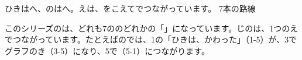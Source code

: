   {ひきはへ、のはへ。えは、をこえてでつながっています。}
  {7本の路線}

このシリーズのは、どれも7ののどれかの「」になっています。じのは、1つのえでつながっています。たとえばのでは、1の「ひきは、かわった」（1-5）が、3でグラフのき（3-5）になり、5で（5-1）につながります。

